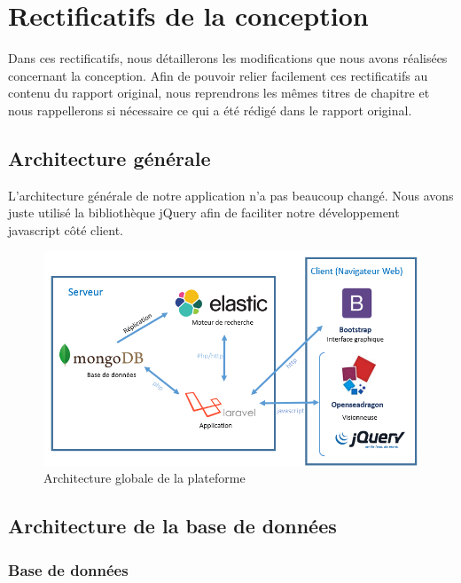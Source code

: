 \section{Rectificatifs de la conception}
\label{sec:majconc}

Dans ces rectificatifs, nous détaillerons les modifications que nous avons réalisées concernant la conception\cite{Conc}. Afin de pouvoir relier facilement ces rectificatifs au contenu du rapport original, nous reprendrons les mêmes titres de chapitre et nous rappellerons si nécessaire ce qui a été rédigé dans le rapport original. 

\subsection{Architecture générale}

L'architecture générale de notre application n'a pas beaucoup changé. Nous avons juste utilisé la bibliothèque jQuery afin de faciliter notre développement javascript côté client.

    \begin{figure}[H]
        \centering
        \includegraphics[width=\textwidth]{figure/Archi.png}
            \caption{Architecture globale de la plateforme}
            \label{archi}
    \end{figure}
		
\subsection{Architecture de la base de données}

\subsubsection{Base de données}

